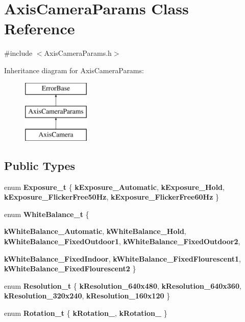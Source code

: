 \hypertarget{classAxisCameraParams}{
\section{AxisCameraParams Class Reference}
\label{classAxisCameraParams}
}


{\ttfamily \#include $<$AxisCameraParams.h$>$}

Inheritance diagram for AxisCameraParams:\begin{figure}[H]
\begin{center}
\leavevmode
\includegraphics[height=3.000000cm]{classAxisCameraParams}
\end{center}
\end{figure}
\subsection*{Public Types}
\begin{DoxyCompactItemize}
\item 
enum {\bfseries Exposure\_\-t} \{ {\bfseries kExposure\_\-Automatic}, 
{\bfseries kExposure\_\-Hold}, 
{\bfseries kExposure\_\-FlickerFree50Hz}, 
{\bfseries kExposure\_\-FlickerFree60Hz}
 \}
\item 
enum {\bfseries WhiteBalance\_\-t} \{ \par
{\bfseries kWhiteBalance\_\-Automatic}, 
{\bfseries kWhiteBalance\_\-Hold}, 
{\bfseries kWhiteBalance\_\-FixedOutdoor1}, 
{\bfseries kWhiteBalance\_\-FixedOutdoor2}, 
\par
{\bfseries kWhiteBalance\_\-FixedIndoor}, 
{\bfseries kWhiteBalance\_\-FixedFlourescent1}, 
{\bfseries kWhiteBalance\_\-FixedFlourescent2}
 \}
\item 
enum {\bfseries Resolution\_\-t} \{ {\bfseries kResolution\_\-640x480}, 
{\bfseries kResolution\_\-640x360}, 
{\bfseries kResolution\_\-320x240}, 
{\bfseries kResolution\_\-160x120}
 \}
\item 
enum {\bfseries Rotation\_\-t} \{ {\bfseries kRotation\_}, 
{\bfseries kRotation\_}
 \}
\end{DoxyCompactItemize}
